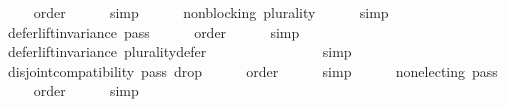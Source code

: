 \begin{isabellebody}
\ \ \ \ \isamarkupfalse%
\ order\isanewline
\ \ \ \ \isamarkupfalse%
\ simp\ \isanewline
\ \ \isamarkupfalse%
\ {}{}{}{}{}{\isacharcolon}{\kern0pt}\ {\isachardoublequoteopen}non{\isacharunderscore}{\kern0pt}blocking\ {\isacharparenleft}{\kern0pt}plurality{\isasymdown}{\isacharparenright}{\kern0pt}{\isachardoublequoteclose}\isanewline
\ \ \ \ \isamarkupfalse%
\ simp\ \isanewline
\isanewline
\ \ \isamarkupfalse%
\ {}{}{}{}{\isacharcolon}{\kern0pt}\ {\isachardoublequoteopen}defer{\isacharunderscore}{\kern0pt}lift{\isacharunderscore}{\kern0pt}invariance\ {\isacharquery}{\kern0pt}pass{}{\isachardoublequoteclose}\isanewline
\ \ \ \ \isamarkupfalse%
\ order\isanewline
\ \ \ \ \isamarkupfalse%
\ simp\ \isanewline
\ \ \isamarkupfalse%
\ {}{}{}{}{\isacharcolon}{\kern0pt}\ {\isachardoublequoteopen}defer{\isacharunderscore}{\kern0pt}lift{\isacharunderscore}{\kern0pt}invariance\ {\isacharquery}{\kern0pt}plurality{\isacharunderscore}{\kern0pt}defer{\isachardoublequoteclose}\isanewline
\ \ \ \ \isamarkupfalse%
\ {}{}{}{}{}\ {}{}{}{}{}\ {}{}{}{}{}\ {}{}{}{}{}\ {}{}{}{}{}\isanewline
\ \ \ \ \isamarkupfalse%
\ simp\ \isanewline
\ \ \isamarkupfalse%
\ {}{}{}{}{\isacharcolon}{\kern0pt}\ {\isachardoublequoteopen}disjoint{\isacharunderscore}{\kern0pt}compatibility\ {\isacharquery}{\kern0pt}pass{}\ {\isacharquery}{\kern0pt}drop{}{\isachardoublequoteclose}\isanewline
\ \ \ \ \isamarkupfalse%
\ order\isanewline
\ \ \ \ \isamarkupfalse%
\ simp\ \isanewline
\ \ \isamarkupfalse%
\ {}{}{}{}{\isacharcolon}{\kern0pt}\ {\isachardoublequoteopen}non{\isacharunderscore}{\kern0pt}electing\ {\isacharquery}{\kern0pt}pass{}{\isachardoublequoteclose}\isanewline
\ \ \ \ \isamarkupfalse%
\ order\isanewline
\ \ \ \ \isamarkupfalse%
\ simp\ \isanewline

\end{isabellebody}
